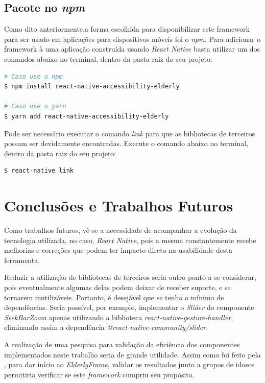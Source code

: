 \documentclass[
	12pt,				    %
	openright,			    %
	oneside,			    %
	a4paper,			    %
    sumario=tradicional,    %
	english,			    %
	brazil,				    %
	]{abntex2}              %
\begin{document}
\section{Pacote no \textit{npm}}

Como dito anteriormente,a forma escolhida para disponibilizar este framework para ser usado em aplicações para dispositivos móveis foi o \textit{npm}. Para adicionar o framework à uma aplicação construída usando \textit{React Native} basta utilizar um dos comandos abaixo no terminal, dentro da pasta raiz do seu projeto:

\begin{lstlisting}[language=bash]
# Caso use o npm
$ npm install react-native-accessibility-elderly

# Caso use o yarn
$ yarn add react-native-accessibility-elderly
\end{lstlisting}

Pode ser necessário executar o comando \textit{link} para que as bibliotecas de terceiros possam ser devidamente encontradas. Execute o comando abaixo no terminal, dentro da pasta raiz do seu projeto:

\begin{lstlisting}[language=bash]
$ react-native link
\end{lstlisting}

\chapter{Conclusões e Trabalhos Futuros}\label{sec:futuro}

Como trabalhos futuros, vê-se a necessidade de acompanhar a evolução da tecnologia utilizada, no caso, \textit{React Native}, pois a mesma constantemente recebe melhorias e correções que podem ter impacto direto na usabilidade desta ferramenta.

Reduzir a utilização de bibliotecas de terceiros seria outro ponto a se considerar, pois eventualmente algumas delas podem deixar de receber suporte, e se tornarem inutilizáveis. Portanto, é desejável que se tenha o mínimo de dependências. Seria possível, por exemplo, implementar o \textit{Slider} do componente \textit{SeekBarZoom} apenas utilizando a biblioteca \textit{react-native-gesture-handler}, eliminando assim a dependência \textit{@react-native-community/slider}.

A realização de uma pesquisa para validação da eficiência dos componentes implementados neste trabalho seria de grande utilidade. Assim como foi feito pela \Cite{tesedamaris}, para dar início ao \textit{ElderlyFrame}, validar os resultados junto a grupos de idosos permitiria verificar se este \textit{framework} cumpriu seu propósito.
\end{document}
